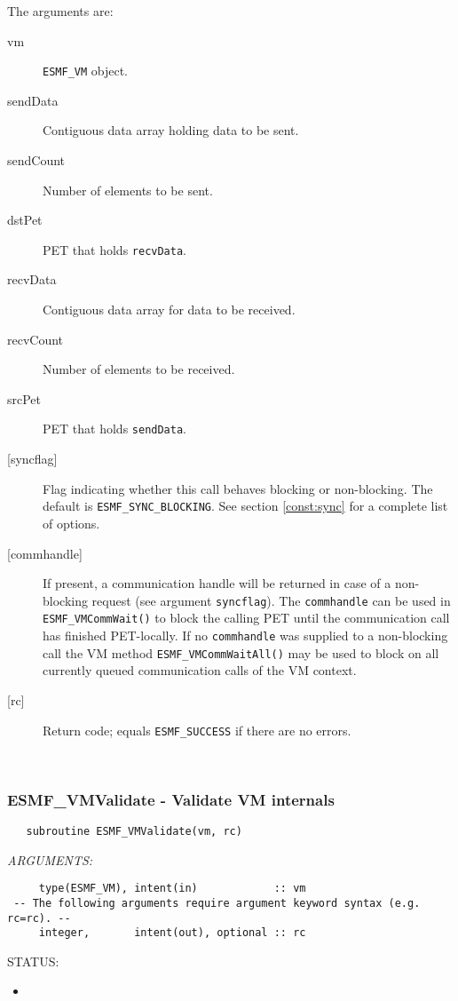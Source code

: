      The arguments are:
     \begin{description}
     \item[vm] 
          {\tt ESMF\_VM} object.
     \item[sendData] 
          Contiguous data array holding data to be sent.
     \item[sendCount] 
          Number of elements to be sent.
     \item[dstPet] 
          PET that holds {\tt recvData}.
     \item[recvData] 
          Contiguous data array for data to be received.
     \item[recvCount] 
          Number of elements to be received.
     \item[srcPet] 
          PET that holds {\tt sendData}.
     \item[{[syncflag]}]
          Flag indicating whether this call behaves blocking or non-blocking.
          The default is {\tt ESMF\_SYNC\_BLOCKING}. See section
          \ref{const:sync} for a complete list of options.
     \item[{[commhandle]}]
          If present, a communication handle will be returned in case of a 
          non-blocking request (see argument {\tt syncflag}). The
          {\tt commhandle} can be used in {\tt ESMF\_VMCommWait()} to block the
          calling PET until the communication call has finished PET-locally. If
          no {\tt commhandle} was supplied to a non-blocking call the VM method
          {\tt ESMF\_VMCommWaitAll()} may be used to block on all currently queued
          communication calls of the VM context.
     \item[{[rc]}] 
          Return code; equals {\tt ESMF\_SUCCESS} if there are no errors.
     \end{description}
   
 
\mbox{}\hrulefill\ 
 
\subsubsection [ESMF\_VMValidate] {ESMF\_VMValidate - Validate VM internals}


 
\begin{verbatim}   subroutine ESMF_VMValidate(vm, rc)\end{verbatim}{\em ARGUMENTS:}
\begin{verbatim}     type(ESMF_VM), intent(in)            :: vm
 -- The following arguments require argument keyword syntax (e.g. rc=rc). --
     integer,       intent(out), optional :: rc  \end{verbatim}
{\sf STATUS:}
   \begin{itemize}
   \item{}
   \end{itemize}
  
